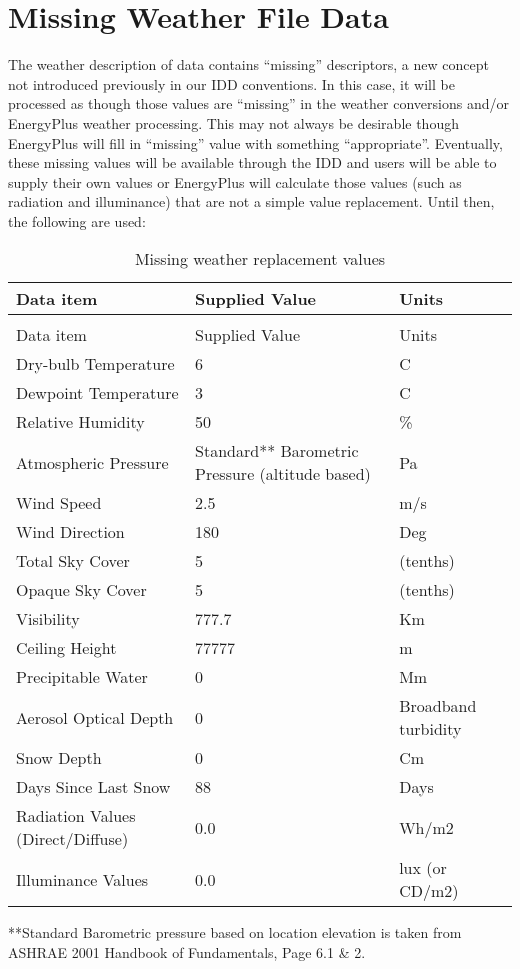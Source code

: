 \section{Missing Weather File Data}\label{missing-weather-file-data}

The weather description of data contains ``missing'' descriptors, a new concept not introduced previously in our IDD conventions. In this case, it will be processed as though those values are ``missing'' in the weather conversions and/or EnergyPlus weather processing. This may not always be desirable though EnergyPlus will fill in ``missing'' value with something ``appropriate''. Eventually, these missing values will be available through the IDD and users will be able to supply their own values or EnergyPlus will calculate those values (such as radiation and illuminance) that are not a simple value replacement. Until then, the following are used:

\begin{longtable}[c]{p{1.83in}p{2.67in}p{1.5in}}
\caption{Missing weather replacement values \label{table:missing-weather-replacement-values}} \tabularnewline
\toprule 
Data item & Supplied Value & Units \tabularnewline
\midrule
\endfirsthead

\caption[]{Missing weather replacement values} \tabularnewline
\toprule 
Data item & Supplied Value & Units \tabularnewline
\midrule
\endhead

Dry-bulb Temperature & 6 & C \tabularnewline
Dewpoint Temperature & 3 & C \tabularnewline
Relative Humidity & 50 & \% \tabularnewline
Atmospheric Pressure & Standard** Barometric Pressure (altitude based) & Pa \tabularnewline
Wind Speed & 2.5 & m/s \tabularnewline
Wind Direction & 180 & Deg \tabularnewline
Total Sky Cover & 5 & (tenths) \tabularnewline
Opaque Sky Cover & 5 & (tenths) \tabularnewline
Visibility & 777.7 & Km \tabularnewline
Ceiling Height & 77777 & m \tabularnewline
Precipitable Water & 0 & Mm \tabularnewline
Aerosol Optical Depth & 0 & Broadband turbidity \tabularnewline
Snow Depth & 0 & Cm \tabularnewline
Days Since Last Snow & 88 & Days \tabularnewline
Radiation Values (Direct/Diffuse) & 0.0 & Wh/m2 \tabularnewline
Illuminance Values & 0.0 & lux (or CD/m2) \tabularnewline
\bottomrule
\end{longtable}

**Standard Barometric pressure based on location elevation is taken from ASHRAE 2001 Handbook of Fundamentals, Page 6.1 \& 2.
